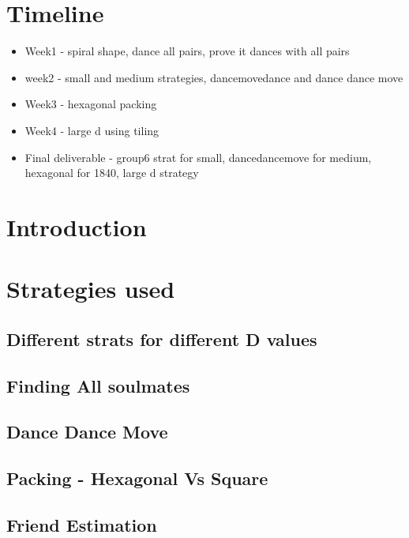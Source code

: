 \section{Timeline}\label{timeline}

\begin{itemize}
\tightlist
\item
  Week1 - spiral shape, dance all pairs, prove it dances with all pairs
\item
  week2 - small and medium strategies, dancemovedance and dance dance
  move
\item
  Week3 - hexagonal packing
\item
  Week4 - large d using tiling
\item
  Final deliverable - group6 strat for small, dancedancemove for medium,
  hexagonal for 1840, large d strategy
\end{itemize}

\section{Introduction}\label{introduction}

\section{Strategies used}\label{strategies-used}

\subsection{Different strats for different D
values}\label{different-strats-for-different-d-values}

\subsection{Finding All soulmates}\label{finding-all-soulmates}

\subsection{Dance Dance Move}\label{dance-dance-move}

\subsection{Packing - Hexagonal Vs
Square}\label{packing---hexagonal-vs-square}

\subsection{Friend Estimation}\label{friend-estimation}

